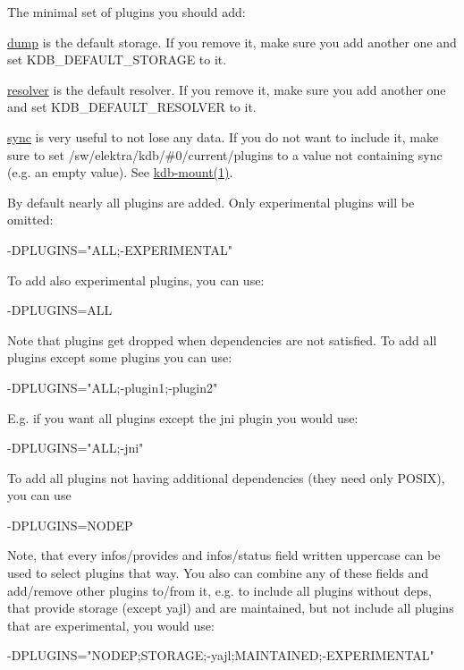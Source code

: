 The minimal set of plugins you should add\+:
\begin{DoxyItemize}
\item \hyperlink{md_src_plugins_dump_README_src_plugins_dump_README_md}{dump} is the default storage. If you remove it, make sure you add another one and set {\ttfamily K\+D\+B\+\_\+\+D\+E\+F\+A\+U\+L\+T\+\_\+\+S\+T\+O\+R\+A\+G\+E} to it.
\item \hyperlink{md_src_plugins_resolver_README_src_plugins_resolver_README_md}{resolver} is the default resolver. If you remove it, make sure you add another one and set {\ttfamily K\+D\+B\+\_\+\+D\+E\+F\+A\+U\+L\+T\+\_\+\+R\+E\+S\+O\+L\+V\+E\+R} to it.
\item \hyperlink{md_src_plugins_sync_README_src_plugins_sync_README_md}{sync} is very useful to not lose any data. If you do not want to include it, make sure to set {\ttfamily /sw/elektra/kdb/\#0/current/plugins} to a value not containing sync (e.\+g. an empty value). See \hyperlink{md_doc_help_kdb-mount_doc_help_kdb-mount_md}{kdb-\/mount(1)}.
\end{DoxyItemize}

By default nearly all plugins are added. Only experimental plugins will be omitted\+: \begin{DoxyVerb}-DPLUGINS="ALL;-EXPERIMENTAL"
\end{DoxyVerb}


To add also experimental plugins, you can use\+: \begin{DoxyVerb}-DPLUGINS=ALL
\end{DoxyVerb}


Note that plugins get dropped when dependencies are not satisfied. To add all plugins except some plugins you can use\+: \begin{DoxyVerb}-DPLUGINS="ALL;-plugin1;-plugin2"
\end{DoxyVerb}


E.\+g. if you want all plugins except the jni plugin you would use\+: \begin{DoxyVerb}-DPLUGINS="ALL;-jni"
\end{DoxyVerb}


To add all plugins not having additional dependencies (they need only P\+O\+S\+I\+X), you can use \begin{DoxyVerb}-DPLUGINS=NODEP
\end{DoxyVerb}


Note, that every {\ttfamily infos/provides} and {\ttfamily infos/status} field written uppercase can be used to select plugins that way. You also can combine any of these fields and add/remove other plugins to/from it, e.\+g. to include all plugins without deps, that provide storage (except {\ttfamily yajl}) and are maintained, but not include all plugins that are experimental, you would use\+: \begin{DoxyVerb}-DPLUGINS="NODEP;STORAGE;-yajl;MAINTAINED;-EXPERIMENTAL"
\end{DoxyVerb}


